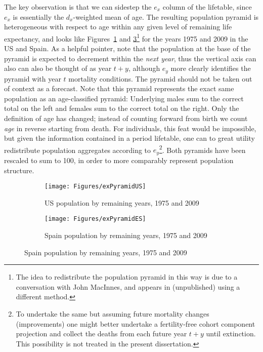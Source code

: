  \FloatBarrier

The key
observation is that we can sidestep the $e_x$ column of the lifetable, since
$e_x$ is essentially the $d_x$-weighted mean of age. The resulting
population pyramid is heterogeneous with respect to age within any given level of remaining life
expectancy, and looks like
Figures~\ref{fig:exPyrUS} and \ref{fig:exPyrES}\footnote{The idea to
redistribute the population pyramid in this way is due to a conversation with 
John MacInnes, and appears in \citep{MacInnes2013pop} (unpublished) using a
different method.} for the years 1975 and 2009 in the US and Spain. As a helpful
pointer, note that the population at the base of the pyramid is expected to decrement
within the \textit{next year}, thus the vertical axis can also can also be
thought of as year $t+y$, although $e_y$ more clearly identifies the pyramid
with year $t$ mortality conditions. The pyramid should not be
taken out of context as a forecast. Note that this pyramid represents the exact same
population as an age-classified pyramid: Underlying males sum to the correct total on 
the left and females sum to the correct total on the right. Only the definition of age has
changed; instead of counting forward from birth we count \textit{age} in reverse
starting from death. For individuals, this feat would be impossible, but given
 the information contained in a period lifetable, one can to great utility 
 redistribute population aggregates according to $e_y$\footnote{To undertake
 the same but assuming future mortality changes (improvements) one might
 better undertake a fertility-free cohort component projection and collect the
 deaths from each future year $t+y$ until extinction. This possibility is not
 treated in the present dissertation.}. Both pyramids have been rescaled
 to sum to 100, in order to more comparably represent population structure.

\begin{figure}
        \centering
        \begin{subfigure}
                \centering
                \caption{US population by remaining years, 1975 and 2009}
                \texttt{[image: Figures/exPyramidUS]}
                \label{fig:exPyrUS}
        \end{subfigure}
        \begin{subfigure}
                \centering
                \caption{Spain population by remaining years, 1975 and 2009}
                \texttt{[image: Figures/exPyramidES]}
               
                \label{fig:exPyrES}
        \end{subfigure}
\end{figure}

